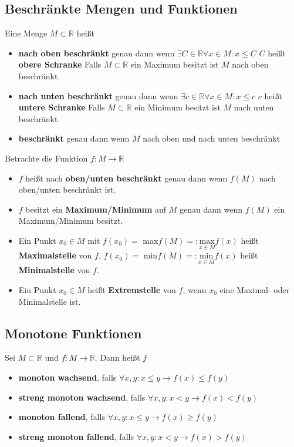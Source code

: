 \documentclass[12pt]{article}
\begin{document}
\subsection{Beschränkte Mengen und Funktionen}
Eine Menge $M \subset \mathbb{R}$ heißt
\begin{itemize}
    \item \textbf{nach oben beschränkt} genau dann wenn $\exists C \in \mathbb{R} \forall x \in M : x \leq C$
        \subitem $C$ heißt \textbf{obere Schranke}
        \subitem Falls $M \subset \mathbb{R}$ ein Maximum besitzt ist $M$ nach oben beschränkt.
    \item \textbf{nach unten beschränkt} genau dann wenn $\exists c \in \mathbb{R} \forall x \in M : x \leq c$
        \subitem $c$ heißt \textbf{untere Schranke}
        \subitem Falls $M \subset \mathbb{R}$ ein Minimum besitzt ist $M$ nach unten beschränkt.
    \item \textbf{beschränkt} genau dann wenn $M$ nach oben und nach unten beschränkt
\end{itemize}
Betrachte die Funktion $f: M \to \mathbb{R}$
\begin{itemize}
    \item $f$ heißt nach \textbf{oben/unten beschränkt} genau dann wenn $f(M)$ nach oben/unten beschränkt ist.
    \item $f$ besitzt ein \textbf{Maximum/Minimum} auf $M$ genau dann wenn $f(M)$ ein Maximum/Minimum besitzt.
    \item Ein Punkt $x_0 \in M$ mit 
        \subitem $f(x_0) =$ max$f(M) =: \underset{x \in M}{\text{max}} f(x)$ heißt \textbf{Maximalstelle} von $f$,
        \subitem $f(x_0) =$ min$f(M) =: \underset{x \in M}{\text{min}} f(x)$ heißt \textbf{Minimalstelle} von $f$.
    \item Ein Punkt $x_0 \in M$ heißt \textbf{Extremstelle} von $f$, wenn $x_0$ eine Maximal- oder Minimalstelle ist.
\end{itemize}
\subsection{Monotone Funktionen}
Sei $M \subset \mathbb{R}$ und $f: M \to \mathbb{R}$. Dann heißt $f$
\begin{itemize}
    \item \textbf{monoton wachsend}, falls $\forall x,y : x \leq y \to f(x) \leq f(y)$
    \item \textbf{streng monoton wachsend}, falls $\forall x,y : x < y \to f(x) < f(y)$
    \item \textbf{monoton fallend}, falls $\forall x,y : x \leq y \to f(x) \geq f(y)$
    \item \textbf{streng monoton fallend}, falls $\forall x,y : x < y \to f(x) > f(y)$
\end{itemize}
\end{document}
